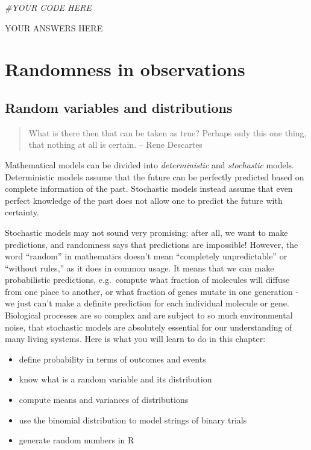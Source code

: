 \documentclass[
]{book}
\newenvironment{Shaded}{\begin{snugshade}}{\end{snugshade}}
\newcommand{\CommentTok}[1]{\textcolor[rgb]{0.56,0.35,0.01}{\textit{#1}}}
\theoremstyle{definition}
\theoremstyle{definition}
\theoremstyle{definition}
\theoremstyle{remark}
\begin{document}
\begin{Shaded}
\begin{Highlighting}[]
\CommentTok{\#YOUR CODE HERE}
\end{Highlighting}
\end{Shaded}

YOUR ANSWERS HERE

\hypertarget{part-randomness-in-observations}{%
\part{Randomness in observations}\label{part-randomness-in-observations}}

\hypertarget{random-variables-and-distributions}{%
\chapter{Random variables and distributions}\label{random-variables-and-distributions}}

\begin{quote}
What is there then that can be taken as true? Perhaps only this one thing, that nothing at all is certain.
-- Rene Descartes
\end{quote}

Mathematical models can be divided into \emph{deterministic} and \emph{stochastic} models. Deterministic models assume that the future can be perfectly predicted based on complete information of the past. Stochastic models instead assume that even perfect knowledge of the past does not allow one to predict the future with certainty.

Stochastic models may not sound very promising: after all, we want to make predictions, and randomness says that predictions are impossible! However, the word ``random'' in mathematics doesn't mean ``completely unpredictable'' or ``without rules,'' as it does in common usage. It means that we can make probabilistic predictions, e.g.~compute what fraction of molecules will diffuse from one place to another, or what fraction of genes mutate in one generation - we just can't make a definite prediction for each individual molecule or gene. Biological processes are so complex and are subject to so much environmental noise, that stochastic models are absolutely essential for our understanding of many living systems. Here is what you will learn to do in this chapter:

\begin{itemize}
\item
  define probability in terms of outcomes and events
\item
  know what is a random variable and its distribution
\item
  compute means and variances of distributions
\item
  use the binomial distribution to model strings of binary trials
\item
  generate random numbers in R
\end{itemize}
\end{document}
